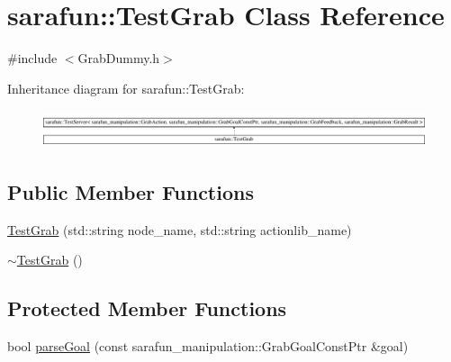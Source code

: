 \hypertarget{classsarafun_1_1TestGrab}{\section{sarafun\-:\-:Test\-Grab Class Reference}
\label{classsarafun_1_1TestGrab}
}


{\ttfamily \#include $<$Grab\-Dummy.\-h$>$}

Inheritance diagram for sarafun\-:\-:Test\-Grab\-:\begin{figure}[H]
\begin{center}
\leavevmode
\includegraphics[height=1.122244cm]{classsarafun_1_1TestGrab}
\end{center}
\end{figure}
\subsection*{Public Member Functions}
\begin{DoxyCompactItemize}
\item 
\hyperlink{classsarafun_1_1TestGrab_a3f9ee23df0bde4b2e8e48d1bc6f942b7}{Test\-Grab} (std\-::string node\-\_\-name, std\-::string actionlib\-\_\-name)
\item 
\hyperlink{classsarafun_1_1TestGrab_a68d490aee932b31716030f11ad969fdf}{$\sim$\-Test\-Grab} ()
\end{DoxyCompactItemize}
\subsection*{Protected Member Functions}
\begin{DoxyCompactItemize}
\item 
bool \hyperlink{classsarafun_1_1TestGrab_a3a7022f2d95efa833b72f745bca91a04}{parse\-Goal} (const sarafun\-\_\-manipulation\-::\-Grab\-Goal\-Const\-Ptr \&goal)
\end{DoxyCompactItemize}


